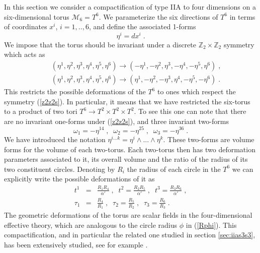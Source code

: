 \documentclass[11pt,a4paper]{article}
\numberwithin{equation}{section}
\numberwithin{table}{section}\setlength{\multlinegap}{25pt}
\newcommand{\bea}{\begin{eqnarray}}  \newcommand{\eea}{\end{eqnarray}}
\newcommand{\nn}{\nonumber}
\newcommand{\cM}{\mathcal M}
\newcommand{\be}{\begin{equation}}
\newcommand{\ee}{\end{equation}}
\begin{document}
In this section we consider a compactification of type IIA to four dimensions on a six-dimensional torus $\cM_6=T^6$. We parameterize the six directions of $T^6$ in terms of coordinates $x^i$, $i=1,..,6$, and define the associated 1-forms 
\be
\eta^i = dx^i \;.
\ee
We impose that the torus should be invariant under a discrete $\mathbb{Z}_2 \times \mathbb{Z}_2$ symmetry which acts as
\bea
& &\left( \eta^1,\eta^2,\eta^3,\eta^4,\eta^5,\eta^6 \right) \rightarrow \left( -\eta^1,-\eta^2,\eta^3,-\eta^4,-\eta^5,\eta^6 \right) \;, \nn \\
& &\left( \eta^1,\eta^2,\eta^3,\eta^4,\eta^5,\eta^6 \right) \rightarrow \left( \eta^1,-\eta^2,-\eta^3,\eta^4,-\eta^5,-\eta^6 \right) \;.
\label{z2z2s}
\eea
This restricts the possible deformations of the $T^6$ to ones which respect the symmetry (\ref{z2z2s}). In particular, it means that we have restricted the six-torus to a product of two tori $T^6 \rightarrow  T^2 \times T^2 \times T^2$. To see this one can note that there are no invariant one-forms under (\ref{z2z2s}), and three invariant two-forms
\be
\omega_1 = -\eta^{14} \;, \;\; \omega_2 = -\eta^{25} \;, \;\; \omega_3 = -\eta^{36} \;.
\label{omdef}
\ee
We have introduced the notation $\eta^{i...k} = \eta^{i}\wedge ... \wedge \eta^{k}$. These two-forms are volume forms for the volume of each two-torus. Each two-torus then has two deformation parameters associated to it, its overall volume and the ratio of the radius of its two constituent circles. Denoting by $R_i$ the radius of each circle in the $T^6$ we can explicitly write the possible deformations of it as
\bea
t^1 &=& \frac{R_1 R_4}{\alpha'} \;,\;\; t^2= \frac{R_2 R_5}{\alpha'} \;,\;\; t^3= \frac{R_3 R_6}{\alpha'} \;, \nn \\
\tau_1 &=& \frac{R_4}{R_1} \;,\;\; \tau_2 = \frac{R_5}{R_2} \;,\;\; \tau_3 = \frac{R_6}{R_3} \;.
\label{defrs}
\eea
The geometric deformations of the torus are scalar fields in the four-dimensional effective theory, which are analogous to the circle radius $\phi$ in (\ref{Rphi}). This compactification, and in particular the related one studied in section \ref{sec:iias3s3}, has been extensively studied, see for example \cite{Camara:2005dc,Aldazabal:2007sn,DallAgata:2009wsi}. 
\end{document}

